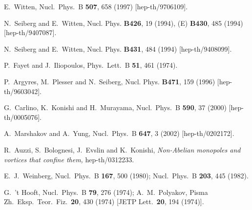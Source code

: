 \documentclass[12pt,epsf]{article}
\begin{document}
\begin{thebibliography}{99}
E.~Witten,
Nucl.\ Phys.\ B {\bf 507}, 658 (1997)
[hep-th/9706109].




N.~Seiberg and E.~Witten,
Nucl. Phys. {\bf B426}, 19 (1994),
(E) {\bf B430},  485 (1994) [hep-th/9407087].

N.~Seiberg and E.~Witten,
Nucl. Phys. {\bf B431}, 484  (1994)
[hep-th/9408099].

P.~Fayet and J.~Iliopoulos,
Phys.\ Lett.\ B {\bf 51}, 461 (1974).



P.~Argyres, M.~Plesser and N.~Seiberg,
Nucl. Phys. {\bf B471}, 159  (1996)
[hep-th/9603042].

G.~Carlino, K.~Konishi and H.~Murayama,
Nucl.\ Phys.\ B {\bf 590}, 37 (2000)
[hep-th/0005076].

A.~Marshakov and A.~Yung,
Nucl.\ Phys.\ B {\bf 647}, 3 (2002)
[hep-th/0202172].

R.~Auzzi, S.~Bolognesi, J.~Evslin and  K.~Konishi,
{\em Non-Abelian monopoles and vortices that confine them,}
hep-th/0312233.

E.~J.~Weinberg,
Nucl.\ Phys.\ B {\bf 167}, 500 (1980);
Nucl.\ Phys.\ B {\bf 203}, 445 (1982).

G.~'t Hooft,
Nucl.\ Phys.\ B {\bf 79}, 276 (1974);
A.~M.~Polyakov,
Pisma Zh.\ Eksp.\ Teor.\ Fiz.\  {\bf 20}, 430 (1974)
[JETP Lett.\  {\bf 20}, 194 (1974)].





\end{thebibliography}
\end{document}
